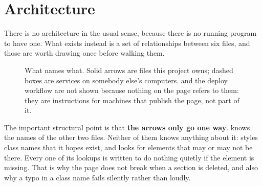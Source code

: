 \documentclass[11pt,a4paper]{article}
\begin{document}
\section{Architecture}

There is no architecture in the usual sense, because there is no running program
to have one. What exists instead is a set of relationships between six files, and
those are worth drawing once before walking them.

\begin{figure}[H]\centering
{}
\caption{What names what. Solid arrows are files this project owns; dashed boxes
are services on somebody else's computers.  and the deploy
workflow are not shown because nothing on the page refers to them: they are
instructions for machines that publish the page, not part of it.}
\end{figure}

The important structural point is that \textbf{the arrows only go one way}.
 knows the names of the other two files. Neither of them knows
anything about it:  styles class names that it hopes exist, and
 looks for elements that may or may not be there. Every one of its
lookups is written to do nothing quietly if the element is missing. That is why
the page does not break when a section is deleted, and also why a typo in a class
name fails silently rather than loudly.
\end{document}
